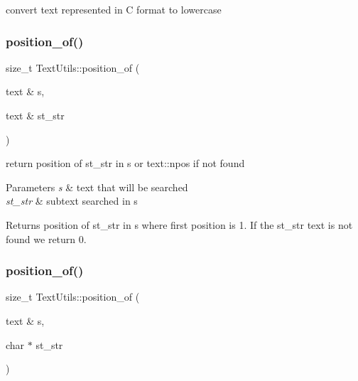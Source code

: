 convert text represented in C format to lowercase \mbox{\label{classez_1_1essential_1_1TextUtils_ad53a4ce5a4bb9e9851dc193c00052120}} 
\subsubsection{\texorpdfstring{position\+\_\+of()}{position\_of()}\hspace{0.1cm}{\footnotesize\ttfamily [1/2]}}
{\footnotesize\ttfamily size\+\_\+t Text\+Utils\+::position\+\_\+of (\begin{DoxyParamCaption}\item[{text \&}]{s,  }\item[{text \&}]{st\+\_\+str }\end{DoxyParamCaption})\hspace{0.3cm}{\ttfamily [static]}}

return position of st\+\_\+str in s or text\+::npos if not found 
\begin{DoxyParams}{Parameters}
{\em s} & text that will be searched \\
\hline
{\em st\+\_\+str} & subtext searched in s \\
\hline
\end{DoxyParams}
\begin{DoxyReturn}{Returns}
position of st\+\_\+str in s where first position is 1. If the st\+\_\+str text is not found we return 0. 
\end{DoxyReturn}
\mbox{\label{classez_1_1essential_1_1TextUtils_ad7c2a4481c49b567bd49ca7fb17ec009}} 
\subsubsection{\texorpdfstring{position\+\_\+of()}{position\_of()}\hspace{0.1cm}{\footnotesize\ttfamily [2/2]}}
{\footnotesize\ttfamily size\+\_\+t Text\+Utils\+::position\+\_\+of (\begin{DoxyParamCaption}\item[{text \&}]{s,  }\item[{char $\ast$}]{st\+\_\+str }\end{DoxyParamCaption})\hspace{0.3cm}{\ttfamily [static]}}


